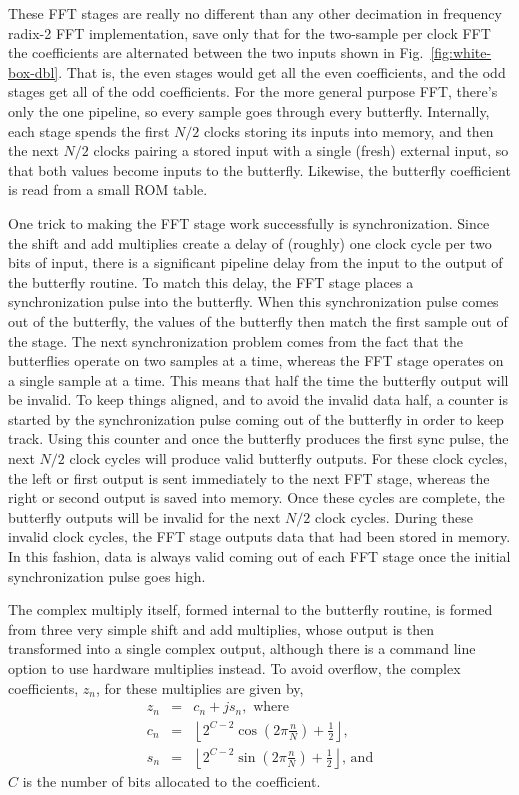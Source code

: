 \documentclass{gqtekspec}
\begin{document}
These FFT stages are really no different than any other decimation in 
frequency radix-2 FFT implementation, save only that for the two-sample per
clock FFT the coefficients are alternated between the two inputs
shown in Fig.~\ref{fig:white-box-dbl}.  That is, the even stages would get all
the even coefficients, and the odd stages get all of the odd coefficients.
For the more general purpose FFT, there's only the one pipeline, so every
sample goes through every butterfly.
Internally, each stage spends the first $N/2$ clocks storing its inputs
into memory, and then the next $N/2$ clocks pairing a stored input with
a single (fresh) external input, so that both values become inputs to the
butterfly.  Likewise, the butterfly coefficient is read from a small ROM table.

One trick to making the FFT stage work successfully is synchronization.  Since
the shift and add multiplies create a delay of (roughly) one clock cycle per
two bits of input, there is a significant pipeline delay from the input to the
output of the butterfly routine.  To match this delay, the FFT stage places a 
synchronization pulse into the butterfly.  When this synchronization pulse
comes out of the butterfly, the values of the butterfly then match the
first sample out of the stage.  The next synchronization problem comes from
the fact that the butterflies operate on two samples at a time, whereas the
FFT stage operates on a single sample at a time.  This means that half the
time the butterfly output will be invalid.  To keep things aligned, and to 
avoid the invalid data half, a counter is started by the synchronization pulse
coming out of the butterfly in order to keep track.  Using this counter and
once the butterfly produces the first sync pulse, the next $N/2$ clock cycles
will produce valid butterfly outputs.  For these clock cycles, the left or
first output is sent immediately to the next FFT stage, whereas the right
or second output is saved into memory.  Once these cycles are complete, the
butterfly outputs will be invalid for the next $N/2$ clock cycles.  During
these invalid clock cycles, the FFT stage outputs data that had been stored
in memory.  In this fashion, data is always valid coming out of each FFT
stage once the initial synchronization pulse goes high.

The complex multiply itself, formed internal to the butterfly routine, is
formed from three very simple shift and add multiplies, whose output is
then transformed into a single complex output, although there is a command
line option to use hardware multiplies instead.  To avoid overflow, the
complex coefficients, $z_n$, for these multiplies are given by,
\begin{eqnarray}
z_n &=& c_n + js_n,\mbox{ where} \\
c_n &=& \left\lfloor 2^{C-2}\cos\left(2\pi \frac{n}{N}\right)+\frac{1}{2}\right\rfloor,\\
s_n &=& \left\lfloor 2^{C-2}\sin\left(2\pi \frac{n}{N}\right)+\frac{1}{2}\right\rfloor\mbox{, and}
\end{eqnarray}
$C$ is the number of bits allocated to the coefficient.
\end{document}
